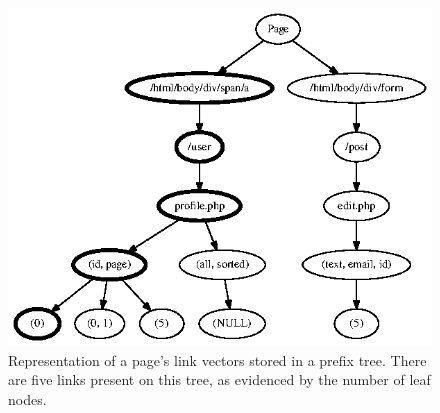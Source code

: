 \begin{figure}[tb]
  \centering
  \includegraphics{figures/page_prefix_tree.ps}
  \caption{Representation of a page's link vectors stored in
    a prefix tree. There are five links present on this tree, as
    evidenced by the number of leaf nodes.}
\end{figure}
